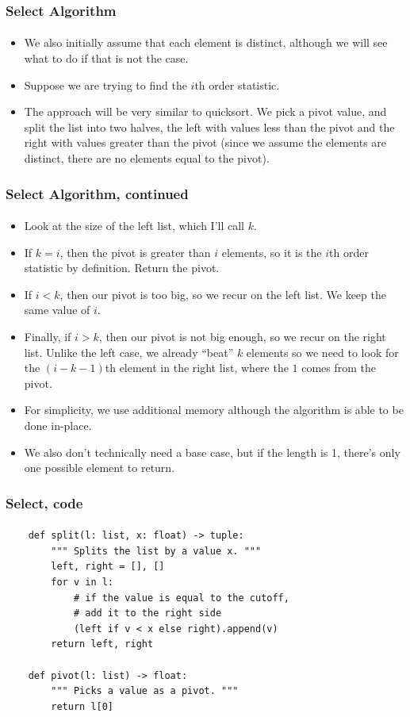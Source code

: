 \documentclass{beamer}                             %
\begin{document}
\begin{frame}
\frametitle{Select Algorithm}
\framesubtitle{}
\begin{itemize}[<+->]
  \item We also initially assume that each element is distinct,
    although we will see what to do if that is not the case.
  \item Suppose we are trying to find the \( i \)th order statistic.
  \item The approach will be very similar to quicksort. We pick a pivot
    value, and split the list into two halves, the left with values less than
    the pivot and the right with values greater than the pivot (since we assume
    the elements are distinct, there are no elements equal to the pivot).
\end{itemize}
\end{frame}

\begin{frame}
\frametitle{Select Algorithm, continued}
\framesubtitle{}
\begin{itemize}[<+->]
  \item Look at the size of the left list, which I'll call \( k \).
  \item If \( k = i \), then the pivot is greater than \( i \) elements,
    so it is the \( i \)th order statistic by definition. Return the pivot.
  \item If \( i < k \), then our pivot is too big, so we recur
    on the left list. We keep the same value of \( i \).
  \item Finally, if \( i > k \), then our pivot is not big enough, so we
    recur on the right list. Unlike the left case, we already \enquote{beat}
    \( k \) elements so we need to look for the \( (i - k - 1) \)th element
    in the right list, where the \( 1 \) comes from the pivot.
  \item For simplicity, we use additional memory
    although the algorithm is able to be done in-place.
  \item We also don't technically need a base case, but if the
    length is 1, there's only one possible element to return.
\end{itemize}
\end{frame}

\begin{frame}[fragile]
\frametitle{Select, code}
\framesubtitle{}
\begin{verbatim}
    def split(l: list, x: float) -> tuple:
        """ Splits the list by a value x. """
        left, right = [], []
        for v in l:
            # if the value is equal to the cutoff,
            # add it to the right side 
            (left if v < x else right).append(v)
        return left, right

    def pivot(l: list) -> float:
        """ Picks a value as a pivot. """
        return l[0]
\end{verbatim}
\end{frame}
\end{document}

